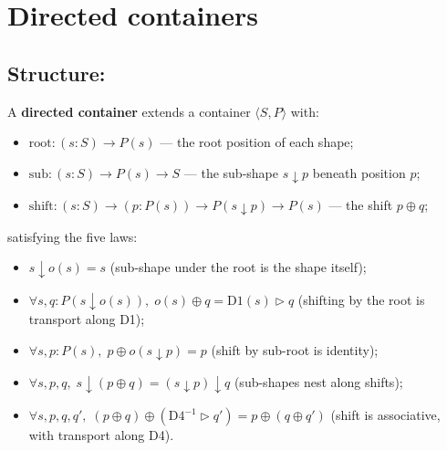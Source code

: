 \documentclass[11pt,a4paper]{article}
\begin{document}
\section{Directed containers}

\subsection{Structure: }

\begin{defn}
A \textbf{directed container} extends a container $\langle S, P \rangle$ with:
\begin{itemize}
  \item $\mathrm{root} : (s : S) \to P(s)$ --- the root position of each shape;
  \item $\mathrm{sub} : (s : S) \to P(s) \to S$ --- the sub-shape
        $s \downarrow p$ beneath position $p$;
  \item $\mathrm{shift} : (s : S) \to (p : P(s)) \to P(s \downarrow p) \to P(s)$
        --- the shift $p \oplus q$;
\end{itemize}
satisfying the five laws:
\begin{itemize}
  \item[D1.] $s \downarrow o(s) = s$ \hfill (sub-shape under the root is the
             shape itself);
  \item[D2.] $\forall s, q : P(s \downarrow o(s)),\;
             o(s) \oplus q = \mathrm{D1}(s) \triangleright q$
             \hfill (shifting by the root is transport along D1);
  \item[D3.] $\forall s, p : P(s),\;
             p \oplus o(s \downarrow p) = p$
             \hfill (shift by sub-root is identity);
  \item[D4.] $\forall s, p, q,\;
             s \downarrow (p \oplus q) = (s \downarrow p) \downarrow q$
             \hfill (sub-shapes nest along shifts);
  \item[D5.] $\forall s, p, q, q',\;
             (p \oplus q) \oplus (\mathrm{D4}^{-1} \triangleright q')
             = p \oplus (q \oplus q')$
             \hfill (shift is associative, with transport along D4).
\end{itemize}
\end{defn}
\end{document}
